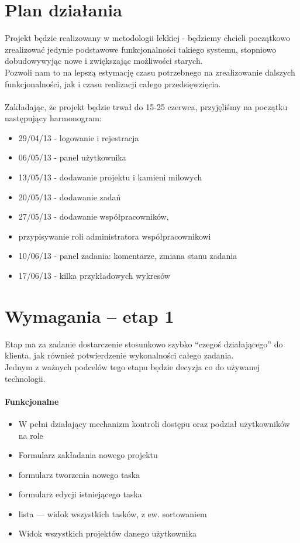 \documentclass[a4paper,12pt,notitlepage]{mwrep}
\begin{document}
\section{Plan działania}
Projekt będzie realizowany w metodologii lekkiej - będziemy chcieli początkowo
zrealizować jedynie podstawowe funkcjonalności takiego systemu, stopniowo dobudowywyjąc
nowe i zwiększając możliwości starych.\\
Pozwoli nam to na lepszą estymację czasu potrzebnego na zrealizowanie dalszych funkcjonalności,
jak i czasu realizacji całego przedsięwzięcia.
\\
\\
Zakładając, że projekt będzie trwał do 15-25 czerwca, przyjęliśmy na początku następujący harmonogram:
\begin{itemize}
	\item	29/04/13 - logowanie i rejestracja
	\item	06/05/13 - panel użytkownika
	\item	13/05/13 - dodawanie projektu i kamieni milowych
	\item	20/05/13 - dodawanie zadań
	\item	27/05/13 - dodawanie współpracowników,
	\item	przypisywanie roli administratora współpracownikowi
	\item	10/06/13 - panel zadania: komentarze, zmiana stanu
		zadania
	\item	17/06/13 - kilka przykładowych wykresów

\end{itemize}




\section{Wymagania -- etap 1}
Etap ma za zadanie dostarczenie stosunkowo szybko “czegoś działającego” do klienta,
jak również potwierdzenie wykonalności całego zadania.\\
Jednym z ważnych podcelów tego etapu będzie decyzja co do używanej technologii.
\paragraph{Funkcjonalne}
\begin{itemize}
	\item	W pełni działający mechanizm kontroli dostępu oraz podział użytkowników na role
	\item	Formularz zakładania nowego projektu
	\item	formularz tworzenia nowego taska
	\item	formularz edycji istniejącego taska
	\item	lista --- widok wszystkich tasków, z ew. sortowaniem
	\item	Widok wszystkich projektów danego użytkownika
\end{itemize}
\end{document}
